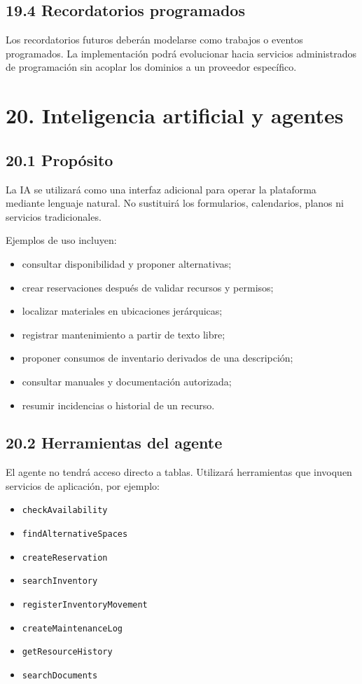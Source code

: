 \documentclass[12pt]{article}
\begin{document}
\subsection*{19.4 Recordatorios programados}

Los recordatorios futuros deberán modelarse como trabajos o eventos programados. La implementación podrá evolucionar hacia servicios administrados de programación sin acoplar los dominios a un proveedor específico.

\section*{20. Inteligencia artificial y agentes}

\subsection*{20.1 Propósito}

La IA se utilizará como una interfaz adicional para operar la plataforma mediante lenguaje natural. No sustituirá los formularios, calendarios, planos ni servicios tradicionales.

Ejemplos de uso incluyen:

\begin{itemize}[leftmargin=1.2cm]
    \item consultar disponibilidad y proponer alternativas;
    \item crear reservaciones después de validar recursos y permisos;
    \item localizar materiales en ubicaciones jerárquicas;
    \item registrar mantenimiento a partir de texto libre;
    \item proponer consumos de inventario derivados de una descripción;
    \item consultar manuales y documentación autorizada;
    \item resumir incidencias o historial de un recurso.
\end{itemize}

\subsection*{20.2 Herramientas del agente}

El agente no tendrá acceso directo a tablas. Utilizará herramientas que invoquen servicios de aplicación, por ejemplo:

\begin{itemize}[leftmargin=1.2cm]
    \item \texttt{checkAvailability}
    \item \texttt{findAlternativeSpaces}
    \item \texttt{createReservation}
    \item \texttt{searchInventory}
    \item \texttt{registerInventoryMovement}
    \item \texttt{createMaintenanceLog}
    \item \texttt{getResourceHistory}
    \item \texttt{searchDocuments}
\end{itemize}
\end{document}
